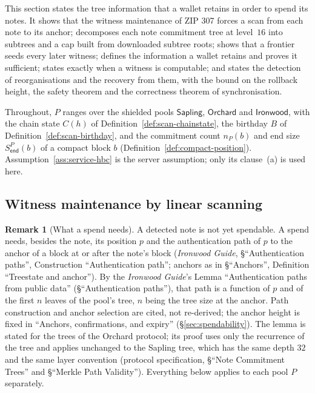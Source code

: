 \documentclass[11pt,a4paper]{article}
\theoremstyle{definition}
\newtheorem{remark}[theorem]{Remark}
\begin{document}
This section states the tree information that a wallet retains in order to
spend its notes. It shows that the witness maintenance of ZIP 307 forces a
scan from each note to its anchor; decomposes each note commitment tree at
level~$16$ into subtrees and a cap built from downloaded subtree roots;
shows that a frontier seeds every later witness; defines the information a
wallet retains and proves it sufficient; states exactly when a witness is
computable; and states the detection of reorganisations and the recovery
from them, with the bound on the rollback height, the safety theorem and
the correctness theorem of synchronisation.

Throughout, $P$ ranges over the shielded pools $\mathsf{Sapling}$,
$\mathsf{Orchard}$ and $\mathsf{Ironwood}$, with the chain state $C(h)$ of
Definition~\ref{def:scan-chainstate}, the birthday $B$ of
Definition~\ref{def:scan-birthday}, and the commitment count $n_P(b)$ and
end size $S^{P}_{\mathsf{end}}(b)$ of a compact block $b$
(Definition~\ref{def:compact-position}). Assumption~\ref{ass:service-hbc}
is the server assumption; only its clause~(a) is used here.

\subsection{Witness maintenance by linear scanning}\label{sec:tree-linear}

\begin{remark}[What a spend needs]
A detected note is not yet spendable. A spend needs, besides the note, its
position $p$ and the authentication path of $p$ to the anchor of a block at
or after the note's block (\emph{Ironwood Guide}, \S``Authentication
paths'', Construction ``Authentication path''; anchors as in \S``Anchors'',
Definition ``Treestate and anchor''). By the \emph{Ironwood Guide}'s Lemma
``Authentication paths from public data'' (\S``Authentication paths''), that
path is a function of $p$ and of the first $n$ leaves of the pool's tree, $n$
being the tree size at the anchor. Path construction and anchor selection are
cited, not re-derived; the anchor height is fixed in ``Anchors, confirmations,
and expiry'' (\S\ref{sec:spendability}). The lemma is stated for the trees of
the Orchard protocol; its proof uses only the recurrence of the tree and applies
unchanged to the Sapling tree, which has the same depth $32$ and the same layer
convention (protocol specification, \S``Note Commitment Trees'' and \S``Merkle
Path Validity''). Everything below applies to each pool $P$ separately.
\end{remark}
\end{document}
